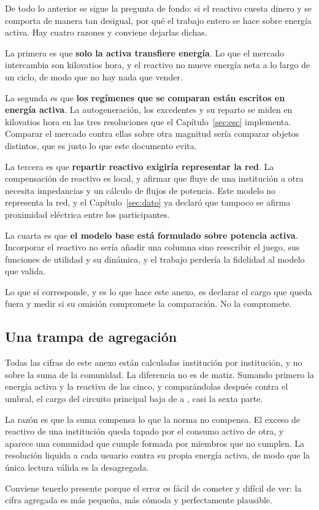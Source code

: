 \begin{detallebox}
De todo lo anterior se sigue la pregunta de fondo: si el reactivo cuesta
dinero y se comporta de manera tan desigual, por qué el trabajo entero se
hace sobre energía activa. Hay cuatro razones y conviene dejarlas dichas.

La primera es que \textbf{solo la activa transfiere energía}. Lo que el
mercado intercambia son kilovatios hora, y el reactivo no mueve energía
neta a lo largo de un ciclo, de modo que no hay nada que vender.

La segunda es que \textbf{los regímenes que se comparan están escritos en
energía activa}. La autogeneración, los excedentes y su reparto se miden
en kilovatios hora en las tres resoluciones que el Capítulo~\ref{sec:esc}
implementa. Comparar el mercado contra ellas sobre otra magnitud sería
comparar objetos distintos, que es justo lo que este documento evita.

La tercera es que \textbf{repartir reactivo exigiría representar la red}.
La compensación de reactivo es local, y afirmar que fluye de una
institución a otra necesita impedancias y un cálculo de flujos de
potencia. Este modelo no representa la red, y el Capítulo~\ref{sec:dato} ya
declaró que tampoco se afirma proximidad eléctrica entre los
participantes.

La cuarta es que \textbf{el modelo base está formulado sobre potencia
activa}. Incorporar el reactivo no sería añadir una columna sino reescribir
el juego, sus funciones de utilidad y su dinámica, y el trabajo perdería la
fidelidad al modelo que valida.

Lo que sí corresponde, y es lo que hace este anexo, es declarar el
cargo que queda fuera y medir si su omisión compromete la comparación. No
la compromete.
\end{detallebox}

\subsection{Una trampa de agregación}
\label{sub:anexo-agregacion}

\begin{trampabox}
Todas las cifras de este anexo están calculadas institución por
institución, y no sobre la suma de la comunidad. La diferencia no es de
matiz. Sumando primero la energía activa y la reactiva de las cinco, y
comparándolas después contra el umbral, el cargo del circuito principal
baja de  a , casi la sexta parte.

La razón es que la suma compensa lo que la norma no compensa. El exceso de
reactivo de una institución queda tapado por el consumo activo de otra, y
aparece una comunidad que cumple formada por miembros que no cumplen. La
resolución liquida a cada usuario contra su propia energía activa, de modo
que la única lectura válida es la desagregada.

Conviene tenerlo presente porque el error es fácil de cometer y difícil de
ver: la cifra agregada es más pequeña, más cómoda y perfectamente
plausible.
\end{trampabox}
